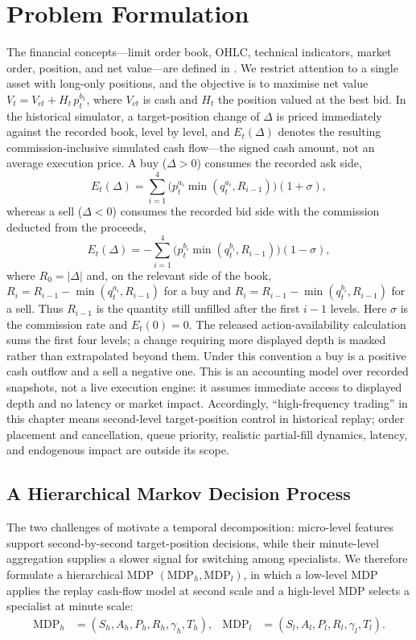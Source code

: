 \section{Problem Formulation}
\label{sec:earnhft_formulation}

The financial concepts---limit order book, OHLC, technical indicators, market order, position, and net value---are defined in . We restrict attention to a single asset with long-only positions, and the objective is to maximise net value $V_t=V_{ct}+H_t\, p_t^{b_1}$, where $V_{ct}$ is cash and $H_t$ the position valued at the best bid. In the historical simulator, a target-position change of $\Delta$ is priced immediately against the recorded book, level by level, and $E_t(\Delta)$ denotes the resulting commission-inclusive simulated cash flow---the signed cash amount, not an average execution price. A buy ($\Delta>0$) consumes the recorded ask side,
\[
E_t(\Delta)=\sum_{i=1}^{4} \bigl(p_t^{a_i}\min(q_t^{a_i},R_{i-1})\bigr)(1+\sigma),
\]
whereas a sell ($\Delta<0$) consumes the recorded bid side with the commission deducted from the proceeds,
\[
E_t(\Delta)=-\sum_{i=1}^{4} \bigl(p_t^{b_i}\min(q_t^{b_i},R_{i-1})\bigr)(1-\sigma),
\]
where $R_0=|\Delta|$ and, on the relevant side of the book, $R_i=R_{i-1}-\min(q_t^{a_i},R_{i-1})$ for a buy and $R_i=R_{i-1}-\min(q_t^{b_i},R_{i-1})$ for a sell. Thus $R_{i-1}$ is the quantity still unfilled after the first $i-1$ levels. Here $\sigma$ is the commission rate and $E_t(0)=0$. The released action-availability calculation sums the first four levels; a change requiring more displayed depth is masked rather than extrapolated beyond them. Under this convention a buy is a positive cash outflow and a sell a negative one. This is an accounting model over recorded snapshots, not a live execution engine: it assumes immediate access to displayed depth and no latency or market impact. Accordingly, ``high-frequency trading'' in this chapter means second-level target-position control in historical replay; order placement and cancellation, queue priority, realistic partial-fill dynamics, latency, and endogenous impact are outside its scope.

\subsection{A Hierarchical Markov Decision Process}
\label{sec:earnhft_hmdp}

The two challenges of  motivate a temporal decomposition: micro-level features support second-by-second target-position decisions, while their minute-level aggregation supplies a slower signal for switching among specialists. We therefore formulate a hierarchical MDP $(\mathrm{MDP}_h,\mathrm{MDP}_l)$, in which a low-level MDP applies the replay cash-flow model at second scale and a high-level MDP selects a specialist at minute scale:
\begin{align*}
\mathrm{MDP}_h &= (S_h,A_h,P_h,R_h,\gamma_h,T_h), &
\mathrm{MDP}_l &= (S_l,A_l,P_l,R_l,\gamma_l,T_l).
\end{align*}

